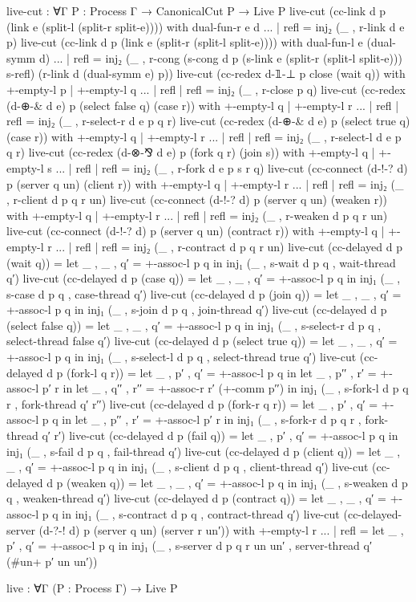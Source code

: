 \begin{code}
live-cut : ∀{Γ} {P : Process Γ} → CanonicalCut P → Live P
live-cut (cc-link d p (link e (split-l (split-r split-e)))) with dual-fun-r e d
... | refl = inj₂ (_ , r-link d e p)
live-cut (cc-link d p (link e (split-r (split-l split-e)))) with dual-fun-l e (dual-symm d)
... | refl = inj₂ (_ , r-cong (s-cong d p (s-link e (split-r (split-l split-e))) s-refl) (r-link d (dual-symm e) p))
live-cut (cc-redex d-𝟙-⊥ p close (wait q)) with +-empty-l p | +-empty-l q
... | refl | refl = inj₂ (_ , r-close p q)
live-cut (cc-redex (d-⊕-& d e) p (select false q) (case r)) with +-empty-l q | +-empty-l r
... | refl | refl = inj₂ (_ , r-select-r d e p q r)
live-cut (cc-redex (d-⊕-& d e) p (select true q) (case r)) with +-empty-l q | +-empty-l r
... | refl | refl = inj₂ (_ , r-select-l d e p q r)
live-cut (cc-redex (d-⊗-⅋ d e) p (fork q r) (join s)) with +-empty-l q | +-empty-l s
... | refl | refl = inj₂ (_ , r-fork d e p s r q)
live-cut (cc-connect (d-!-? d) p (server q un) (client r)) with +-empty-l q | +-empty-l r
... | refl | refl = inj₂ (_ , r-client d p q r un)
live-cut (cc-connect (d-!-? d) p (server q un) (weaken r)) with +-empty-l q | +-empty-l r
... | refl | refl = inj₂ (_ , r-weaken d p q r un)
live-cut (cc-connect (d-!-? d) p (server q un) (contract r)) with +-empty-l q | +-empty-l r
... | refl | refl = inj₂ (_ , r-contract d p q r un)
live-cut (cc-delayed d p (wait q)) =
  let _ , _ , q′ = +-assoc-l p q in
  inj₁ (_ , s-wait d p q , wait-thread q′)
live-cut (cc-delayed d p (case q)) =
  let _ , _ , q′ = +-assoc-l p q in
  inj₁ (_ , s-case d p q , case-thread q′)
live-cut (cc-delayed d p (join q)) =
  let _ , _ , q′ = +-assoc-l p q in
  inj₁ (_ , s-join d p q , join-thread q′)
live-cut (cc-delayed d p (select false q)) =
  let _ , _ , q′ = +-assoc-l p q in
  inj₁ (_ , s-select-r d p q , select-thread false q′)
live-cut (cc-delayed d p (select true q)) =
  let _ , _ , q′ = +-assoc-l p q in
  inj₁ (_ , s-select-l d p q , select-thread true q′)
live-cut (cc-delayed d p (fork-l q r)) =
  let _ , p′ , q′ = +-assoc-l p q in
  let _ , p′′ , r′ = +-assoc-l p′ r in
  let _ , q′′ , r′′ = +-assoc-r r′ (+-comm p′′) in
  inj₁ (_ , s-fork-l d p q r , fork-thread q′ r′′)
live-cut (cc-delayed d p (fork-r q r)) =
  let _ , p′ , q′ = +-assoc-l p q in
  let _ , p′′ , r′ = +-assoc-l p′ r in
  inj₁ (_ , s-fork-r d p q r , fork-thread q′ r′)
live-cut (cc-delayed d p (fail q)) =
  let _ , p′ , q′ = +-assoc-l p q in
  inj₁ (_ , s-fail d p q , fail-thread q′)
live-cut (cc-delayed d p (client q)) =
  let _ , _ , q′ = +-assoc-l p q in
  inj₁ (_ , s-client d p q , client-thread q′)
live-cut (cc-delayed d p (weaken q)) =
  let _ , _ , q′ = +-assoc-l p q in
  inj₁ (_ , s-weaken d p q , weaken-thread q′)
live-cut (cc-delayed d p (contract q)) =
  let _ , _ , q′ = +-assoc-l p q in
  inj₁ (_ , s-contract d p q , contract-thread q′)
live-cut (cc-delayed-server (d-?-! d) p (server q un) (server r un′)) with +-empty-l r
... | refl =
  let _ , p′ , q′ = +-assoc-l p q in
  inj₁ (_ , s-server d p q r un un′ , server-thread q′ (#un+ p′ un un′))

live : ∀{Γ} (P : Process Γ) → Live P
\end{code}
